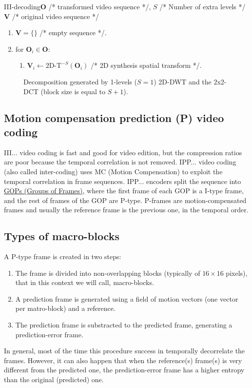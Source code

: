 \begin{myalg}{III-decoding}{$\mathbf{O}$ /* transformed video sequence */, $S$ /* Number of extra levels */}{$\mathbf{V}$ /* original video sequence */}
  \label{alg:III_decoding}
  \begin{enumerate}
  \item ${\mathbf V}=\{\}$ /* empty sequence */.
  \item for ${\mathbf O}_i\in {\mathbf O}$:
    \begin{enumerate}
    \item ${\mathbf V}_i\leftarrow\text{2D-T}^{-S}({\mathbf O}_i)$ /* 2D synthesis spatial transform */.
    \end{enumerate}
  \end{enumerate}
\end{myalg}

\begin{figure}
  \centering
  \caption{Decomposition generated by 1-levels ($S=1$) 2D-DWT and the 2x2-DCT (block size is equal to $S+1$).}
  \label{fig:III}
\end{figure}

\subsection{Motion compensation prediction (P) video coding}
III... video coding is fast and good for video edition, but the
compression ratios are poor because the temporal correlation is not
removed. IPP... video coding (also called inter-coding) uses MC
(Motion Compensation) to exploit the temporal correlation in frame
sequences. IPP... encoders split the sequence into
\href{https://en.wikipedia.org/wiki/Group_of_pictures}{GOPs (Groups of
  Frames)}, where the first frame of each GOP is a I-type frame, and
the rest of frames of the GOP are P-type. P-frames are
motion-compensated frames and usually the reference frame is the
previous one, in the temporal order.

\subsection{Types of macro-blocks}
A P-type frame is created in two steps:
\begin{enumerate}
\item The frame is divided into non-overlapping blocks (typically of
  $16\times 16$ pixels), that in this context we will call,
  macro-blocks.
\item A prediction frame is generated using a field of motion vectors
  (one vector per matro-block) and a reference.
\item The prediction frame is substracted to the predicted frame,
  generating a prediction-error frame.
\end{enumerate}
In general, most of the time this procedure success in temporally
decorrelate the frames. However, it can also happen that when the
reference(s) frame(s) is very different from the predicted one, the
prediction-error frame has a higher entropy than the original
(predicted) one.

